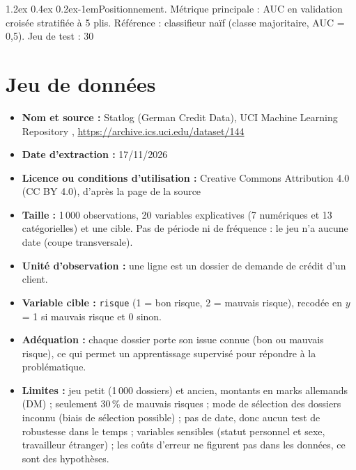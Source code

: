 \documentclass[11pt,a4paper]{article}
\makeatletter
\renewcommand\paragraph{\@startsection{paragraph}{4}{\z@}%
  {1.2ex \@plus 0.4ex \@minus 0.2ex}{-1em}{\normalfont\normalsize\bfseries}}
\makeatother
\begin{document}
\paragraph{Positionnement.} Métrique principale : AUC en validation croisée stratifiée à 5 plis. Référence : classifieur naïf (classe majoritaire, AUC = 0,5). Jeu de test : 30 %

\section{Jeu de données}
\label{sec:donnees}
\begin{itemize}
  \item \textbf{Nom et source :} Statlog (German Credit Data), UCI Machine Learning Repository \cite{donnees}, \url{https://archive.ics.uci.edu/dataset/144}
  \item \textbf{Date d'extraction :} 17/11/2026
  \item \textbf{Licence ou conditions d'utilisation :} Creative Commons Attribution 4.0 (CC BY 4.0), d'après la page de la source
  \item \textbf{Taille :} 1\,000 observations, 20 variables explicatives (7 numériques et 13 catégorielles) et une cible. Pas de période ni de fréquence : le jeu n'a aucune date (coupe transversale).
  \item \textbf{Unité d'observation :} une ligne est un dossier de demande de crédit d'un client.
  \item \textbf{Variable cible :} \texttt{risque} (1 = bon risque, 2 = mauvais risque), recodée en $y$ = 1 si mauvais risque et 0 sinon.
  \item \textbf{Adéquation :} chaque dossier porte son issue connue (bon ou mauvais risque), ce qui permet un apprentissage supervisé pour répondre à la problématique.
  \item \textbf{Limites :} jeu petit (1\,000 dossiers) et ancien, montants en marks allemands (DM) ; seulement 30\,\% de mauvais risques ; mode de sélection des dossiers inconnu (biais de sélection possible) ; pas de date, donc aucun test de robustesse dans le temps ; variables sensibles (statut personnel et sexe, travailleur étranger) ; les coûts d'erreur ne figurent pas dans les données, ce sont des hypothèses.
\end{itemize}
\end{document}
